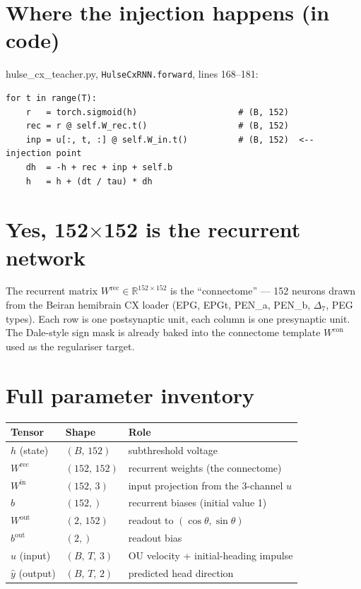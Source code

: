 \documentclass[11pt]{article}
\begin{document}
\section*{Where the injection happens (in code)}

\begin{center}\small\ttfamily
hulse\_cx\_teacher.py, \texttt{HulseCxRNN.forward}, lines 168--181:
\end{center}
\vspace{-0.3em}
{\small
\begin{verbatim}
for t in range(T):
    r   = torch.sigmoid(h)                    # (B, 152)
    rec = r @ self.W_rec.t()                  # (B, 152)
    inp = u[:, t, :] @ self.W_in.t()          # (B, 152)  <-- injection point
    dh  = -h + rec + inp + self.b
    h   = h + (dt / tau) * dh
\end{verbatim}
}

\section*{Yes, 152$\times$152 is the recurrent network}

The recurrent matrix $W^{\mathrm{rec}}\in\mathbb{R}^{152\times 152}$ is the
``connectome'' --- 152 neurons drawn from the Beiran hemibrain CX loader
(EPG, EPGt, PEN\_a, PEN\_b, $\Delta_7$, PEG types). Each row is one
postsynaptic unit, each column is one presynaptic unit. The Dale-style
sign mask is already baked into the connectome template
$W^{\mathrm{con}}$ used as the regulariser target.

\section*{Full parameter inventory}

\begin{center}\small
\begin{tabular}{lll}
\toprule
\textbf{Tensor} & \textbf{Shape} & \textbf{Role} \\
\midrule
$h$ (state)       & $(B,\,152)$        & subthreshold voltage \\
$W^{\mathrm{rec}}$ & $(152,\,152)$     & recurrent weights (the connectome) \\
$W^{\mathrm{in}}$  & $(152,\,3)$       & input projection from the 3-channel $u$ \\
$b$               & $(152,)$           & recurrent biases (initial value 1) \\
$W^{\mathrm{out}}$ & $(2,\,152)$       & readout to $(\cos\theta,\sin\theta)$ \\
$b^{\mathrm{out}}$ & $(2,)$             & readout bias \\
$u$ (input)       & $(B,\,T,\,3)$      & OU velocity + initial-heading impulse \\
$\hat y$ (output) & $(B,\,T,\,2)$      & predicted head direction \\
\bottomrule
\end{tabular}
\end{center}
\end{document}
